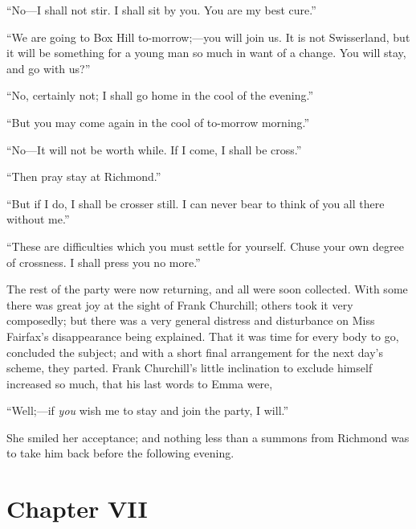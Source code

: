 ``No---I shall not stir.  I shall sit by you.  You are my best cure.''

``We are going to Box Hill to-morrow;---you will join us.
It is not Swisserland, but it will be something for a young
man so much in want of a change.  You will stay, and go with us?''

``No, certainly not; I shall go home in the cool of the evening.''

``But you may come again in the cool of to-morrow morning.''

``No---It will not be worth while.  If I come, I shall be cross.''

``Then pray stay at Richmond.''

``But if I do, I shall be crosser still.  I can never bear to think
of you all there without me.''

``These are difficulties which you must settle for yourself.
Chuse your own degree of crossness.  I shall press you no more.''

The rest of the party were now returning, and all were soon collected.
With some there was great joy at the sight of Frank Churchill;
others took it very composedly; but there was a very general distress
and disturbance on Miss Fairfax's disappearance being explained.
That it was time for every body to go, concluded the subject; and with
a short final arrangement for the next day's scheme, they parted.
Frank Churchill's little inclination to exclude himself increased
so much, that his last words to Emma were,

``Well;---if \emph{you} wish me to stay and join the party, I will.''

She smiled her acceptance; and nothing less than a summons from
Richmond was to take him back before the following evening.



\chapter{Chapter VII}


